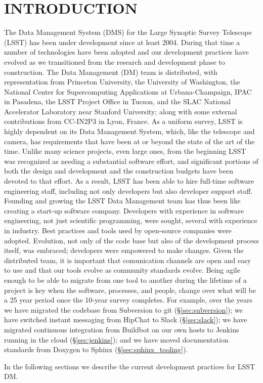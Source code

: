 \section{INTRODUCTION}

The Data Management System (DMS)\cite{2015arXiv151207914J} for the Large Synoptic Survey Telescope (LSST) \cite{2008arXiv0805.2366I} has been under development since at least 2004\cite{2004AAS...20510811A}.
During that time a number of technologies have been adopted and our development practices have evolved as we transitioned from the research and development phase to construction.
The Data Management (DM) team is distributed, with representation from Princeton University, the University of Washington, the National Center for Supercomputing Applications at Urbana-Champaign, IPAC in Pasadena, the LSST Project Office in Tucson, and the SLAC National Accelerator Laboratory near Stanford University; along with some external contributions from CC-IN2P3 in Lyon, France.
As a uniform survey, LSST is highly dependent on its Data Management System, which, like the telescope and camera, has requirements that have been at or beyond the state of the art of the time.
Unlike many science projects, even large ones, from the beginning LSST was recognized as needing a substantial software effort, and significant portions of both the design and development and the construction budgets have been devoted to that effort.
As a result, LSST has been able to hire full-time software engineering staff, including not only developers but also developer support staff.
Founding and growing the LSST Data Management team has thus been like creating a start-up software company.
Developers with experience in software engineering, not just scientific programming, were sought, several with experience in industry.
Best practices and tools used by open-source companies were adopted.
Evolution, not only of the code base but also of the development process itself, was embraced; developers were empowered to make changes.
Given the distributed team, it is important that comunication channels are open and easy to use and that our tools evolve as community standards evolve.
Being agile enough to be able to migrate from one tool to another during the lifetime of a project is key when the software, processes, and people, change over what will be a 25 year period once the 10-year survey completes.
For example, over the years we have migrated the codebase from Subversion to git (\S\ref{sec:subversion}); we have switched instant messaging from HipChat to Slack (\S\ref{sec:slack}); we have migrated continuous integration from Buildbot on our own hosts to Jenkins running in the cloud (\S\ref{sec:jenkins}); and we have moved documentation standards from Doxygen to Sphinx (\S\ref{sec:sphinx_tooling}).

In the following sections we describe the current development practices for LSST DM.
